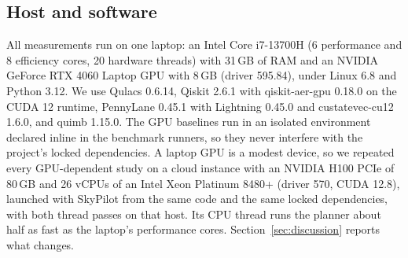 \begin{table}[!t]
\caption{Methods Compared. The Qiskit LightCone Baseline Uses the Actual Commutation-Aware Pass; the Global MPS Uses \texttt{cutoff}${}=0$ and Is Shared by Every Output in a Batch.}
\label{tab:methods}
\centering
\setlength{\tabcolsep}{2pt}
\footnotesize
{}
\end{table}

\subsection{Host and software}
All measurements run on one laptop: an Intel Core i7-13700H (6 performance and 8 efficiency cores, 20 hardware threads) with 31\,GB of RAM and an NVIDIA GeForce RTX 4060 Laptop GPU with 8\,GB (driver 595.84), under Linux 6.8 and Python 3.12. We use Qulacs 0.6.14, Qiskit 2.6.1 with qiskit-aer-gpu 0.18.0 on the CUDA 12 runtime, PennyLane 0.45.1 with Lightning 0.45.0 and custatevec-cu12 1.6.0, and quimb 1.15.0. The GPU baselines run in an isolated environment declared inline in the benchmark runners, so they never interfere with the project's locked dependencies. A laptop GPU is a modest device, so we repeated every GPU-dependent study on a cloud instance with an NVIDIA H100 PCIe of 80\,GB and 26 vCPUs of an Intel Xeon Platinum 8480+ (driver 570, CUDA 12.8), launched with SkyPilot from the same code and the same locked dependencies, with both thread passes on that host. Its CPU thread runs the planner about half as fast as the laptop's performance cores. Section~\ref{sec:discussion} reports what changes.

